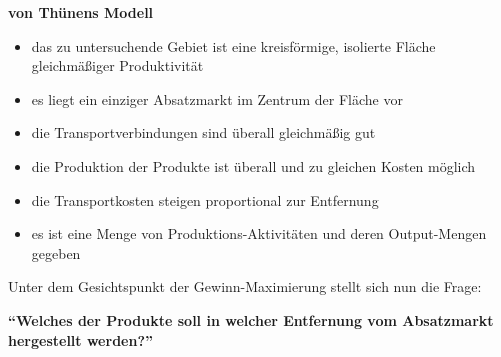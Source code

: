     \par \textbf{von Thünens Modell}

    \begin{itemize}
      \item das zu untersuchende Gebiet ist eine kreisförmige, isolierte Fläche gleichmäßiger
Produktivität
      \item es liegt ein einziger Absatzmarkt im Zentrum der Fläche vor
      \item die Transportverbindungen sind überall gleichmäßig gut
      \item die Produktion der Produkte ist überall und zu gleichen Kosten möglich
      \item die Transportkosten steigen proportional zur Entfernung
      \item es ist eine Menge von Produktions-Aktivitäten und deren Output-Mengen gegeben
    \end{itemize}

    \par Unter dem Gesichtspunkt der Gewinn-Maximierung stellt sich nun die Frage: 

    \textbf{``Welches der Produkte soll in welcher Entfernung vom
Absatzmarkt hergestellt werden?''}
  
    \vspace{1cm}

